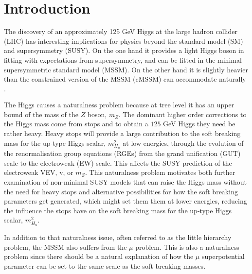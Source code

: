 \documentclass[preprint,amsmath,amssymb,aps,superscriptaddress,prd,showpacs,floatfix]{revtex4-1}
\begin{document}
\maketitle

\section{\label{sec:intro}Introduction}
The discovery of an approximately 125 GeV Higgs
\cite{Aad:2012tfa,Chatrchyan:2012ufa} at the large hadron collider
(LHC) has interesting implications for physics beyond the standard
model (SM) and supersymmetry (SUSY).  On the one hand it provides a
light Higgs boson in fitting with expectations from supersymmetry, and
can be fitted in the minimal supersymmetric standard model (MSSM).  On
the other hand it is slightly heavier than the constrained version of the 
MSSM (cMSSM) can accommodate naturally \cite{Cassel:2011zd,Ghilencea:2012gz}.

The Higgs causes a naturalness problem because at tree level it has an
upper bound of the mass of the $Z$ boson, $m_Z$. The dominant higher
order corrections to the Higgs mass come from stops and to obtain a
$125$ GeV Higgs they need be rather heavy. Heavy stops will provide a
large contribution to the soft breaking mass for the up-type Higgs
scalar, $m_{H_u}^2$ at low energies, through the evolution of the
renormalisation group equations (RGEs) from the grand unification
(GUT) scale to the electroweak (EW) scale. This affects the SUSY
prediction of the electroweak VEV, v, or $m_Z$.  This naturalness
problem motivates both further examination of non-minimal SUSY models
that can raise the Higgs mass without the need for heavy stops and
alternative possibilities for how the soft breaking parameters get
generated, which might set them them at lower energies, reducing the
influence the stops have on the soft breaking mass for the up-type
Higgs scalar, $m_{H_u}^2$.

In addition to that naturalness issue, often referred to as the little
hierarchy problem, the MSSM also suffers from the $\mu$-problem. This
is also a naturalness problem since there should be a natural explanation
of how the $\mu$ superpotential parameter can be set to the same scale
as the soft breaking masses.
\end{document}
